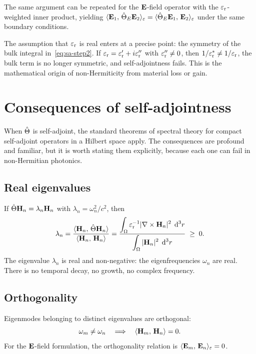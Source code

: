 The same argument can be repeated for the $\mathbf{E}$-field
operator with the $\varepsilon_{\mathrm{r}}$-weighted inner product, yielding
$\langle\mathbf{E}_1,\,\hat{\Theta}_E\mathbf{E}_2\rangle_\varepsilon
 = \langle\hat{\Theta}_E\mathbf{E}_1,\,\mathbf{E}_2\rangle_\varepsilon$
under the same boundary conditions.

\begin{remark}
The assumption that $\varepsilon_{\mathrm{r}}$ is real enters at a precise point: the
symmetry of the bulk integral in~\eqref{eq:sa-step2}. If
$\varepsilon_{\mathrm{r}} = \varepsilon_{\mathrm{r}}' + i\varepsilon_{\mathrm{r}}''$ with $\varepsilon_{\mathrm{r}}'' \neq 0$, then
$1/\varepsilon_{\mathrm{r}}^* \neq 1/\varepsilon_{\mathrm{r}}$, the bulk term is no longer symmetric,
and self-adjointness fails. This is the mathematical origin of
non-Hermiticity from material loss or gain.
\end{remark}


\section{Consequences of self-adjointness}
\label{sec:sa-consequences}

When $\hat{\Theta}$ is self-adjoint, the standard theorems of spectral theory for
compact self-adjoint operators in a Hilbert space apply. The consequences
are profound and familiar, but it is worth stating them explicitly, because
each one can fail in non-Hermitian photonics.

\subsection{Real eigenvalues}
\label{ssec:real-eigenvalues}

If $\hat{\Theta}\mathbf{H}_n = \lambda_n\mathbf{H}_n$ with $\lambda_n = \omega_n^2/c^2$, then
\begin{equation}
 \lambda_n = \frac{\langle\mathbf{H}_n,\,\hat{\Theta}\mathbf{H}_n\rangle}
 {\langle\mathbf{H}_n,\,\mathbf{H}_n\rangle}
 = \frac{\displaystyle\int_\Omega\varepsilon_{\mathrm{r}}^{-1}|\nabla\times\mathbf{H}_n|^2\;\mathop{}\!\mathrm{d}^3 r}
 {\displaystyle\int_\Omega|\mathbf{H}_n|^2\;\mathop{}\!\mathrm{d}^3 r}
 \;\ge\; 0.
 \label{eq:rayleigh-quotient}
\end{equation}
The eigenvalue $\lambda_n$ is real and non-negative: the eigenfrequencies
$\omega_n$ are real. There is no temporal decay, no growth, no complex
frequency.

\subsection{Orthogonality}
\label{ssec:orthogonality}

Eigenmodes belonging to distinct eigenvalues are orthogonal:
\begin{equation}
 \omega_m \neq \omega_n
 \quad\Longrightarrow\quad
 \langle\mathbf{H}_m,\,\mathbf{H}_n\rangle = 0.
 \label{eq:orthogonality}
\end{equation}
For the $\mathbf{E}$-field formulation, the orthogonality relation is
$\langle\mathbf{E}_m,\,\mathbf{E}_n\rangle_\varepsilon = 0$.

